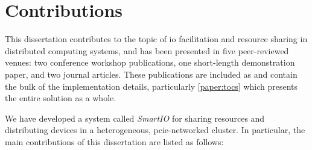 \section{Contributions}
This dissertation contributes to the topic of \gls{io} facilitation and resource sharing in distributed computing systems, and has been presented in five peer-reviewed venues: two conference workshop publications, one short-length demonstration paper, and two journal articles.
These publications are included as  and contain the bulk of the implementation details, particularly \cref{paper:tocs} which presents the entire solution as a whole.

We have developed a system called \emph{SmartIO} for sharing resources and distributing devices in a heterogeneous, \gls{pcie}-networked cluster.
%
In particular, the main contributions of this dissertation are listed as follows:
